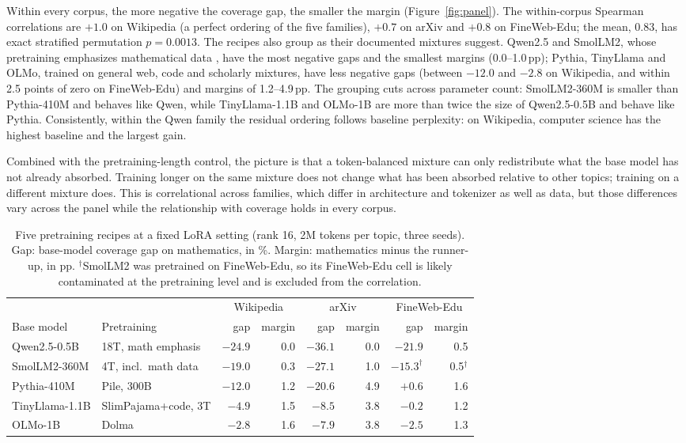 \documentclass[11pt]{article}
\begin{document}
Within every corpus, the more negative the coverage gap, the smaller the
margin (Figure~\ref{fig:panel}). The within-corpus Spearman correlations
are $+1.0$ on Wikipedia (a perfect ordering of the five families), $+0.7$
on arXiv and $+0.8$ on FineWeb-Edu; the mean, $0.83$, has exact stratified
permutation $p{=}0.0013$. The recipes also group as their documented
mixtures suggest. Qwen2.5 and SmolLM2, whose pretraining emphasizes
mathematical data \citep{qwen25,allal2025smollm2}, have the most negative
gaps and the smallest margins (0.0--1.0\,pp); Pythia, TinyLlama and OLMo,
trained on general web, code and scholarly mixtures, have less negative gaps
(between $-12.0$ and $-2.8$ on Wikipedia, and within 2.5 points of zero on
FineWeb-Edu) and margins of 1.2--4.9\,pp. The grouping cuts
across parameter count: SmolLM2-360M is smaller than Pythia-410M and behaves
like Qwen, while TinyLlama-1.1B and OLMo-1B are more than twice the size
of Qwen2.5-0.5B and behave like Pythia. Consistently, within the Qwen family
the residual ordering follows baseline perplexity: on Wikipedia, computer
science has the highest baseline and the largest gain.

Combined with the pretraining-length control, the picture is that a
token-balanced mixture can only redistribute what the base model has not
already absorbed. Training longer on the same mixture does not change what
has been absorbed relative to other topics; training on a different mixture
does. This is correlational across families, which differ in architecture
and tokenizer as well as data, but those differences vary across the panel
while the relationship with coverage holds in every corpus.

\begin{table}[t]
\centering
\caption{Five pretraining recipes at a fixed LoRA setting (rank 16, 2M
tokens per topic, three seeds). Gap: base-model coverage gap on
mathematics, in \%. Margin: mathematics minus the runner-up, in pp.
$^\dagger$SmolLM2 was pretrained on FineWeb-Edu, so its FineWeb-Edu cell is
likely contaminated at the pretraining level and is excluded from the
correlation.}
\label{tab:panel}
\small
\setlength{\tabcolsep}{4pt}
\begin{tabular}{llrrrrrr}
\toprule
 & & \multicolumn{2}{c}{Wikipedia} & \multicolumn{2}{c}{arXiv} & \multicolumn{2}{c}{FineWeb-Edu} \\
Base model & Pretraining & gap & margin & gap & margin & gap & margin \\
\midrule
Qwen2.5-0.5B   & 18T, math emphasis    & $-24.9$ & 0.0 & $-36.1$ & 0.0 & $-21.9$ & 0.5 \\
SmolLM2-360M   & 4T, incl.\ math data  & $-19.0$ & 0.3 & $-27.1$ & 1.0 & $-15.3^\dagger$ & 0.5$^\dagger$ \\
Pythia-410M    & Pile, 300B            & $-12.0$ & 1.2 & $-20.6$ & 4.9 & $+0.6$  & 1.6 \\
TinyLlama-1.1B & SlimPajama+code, 3T   & $-4.9$  & 1.5 & $-8.5$  & 3.8 & $-0.2$  & 1.2 \\
OLMo-1B        & Dolma                 & $-2.8$  & 1.6 & $-7.9$  & 3.8 & $-2.5$  & 1.3 \\
\bottomrule
\end{tabular}
\end{table}
\end{document}
